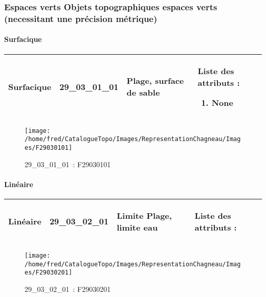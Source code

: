 \documentclass[12pt,titlepage,oneside]{book}
\begin{document}
\subsubsection{\large Espaces verts Objets topographiques espaces verts (necessitant une précision métrique)}
\paragraph{Surfacique}
\noindent
\vspace{\baselineskip}

\renewcommand{\arraystretch}{1.2}
\begin{supertabular}{|p{10cm}|c|p{13cm}|p{12cm}|}
 Surfacique & 29\_03\_01\_01 & Plage, surface de sable & Liste des attributs :
\begin{enumerate}
  \item None\end{enumerate}
\\
\hline
\end{supertabular}
\begin{figure}[h!]
  \hfill         %
  \begin{minipage}[t]{3cm}
    \begin{center}
      \texttt{[image: /home/fred/CatalogueTopo/Images/RepresentationChagneau/Images/F29030101]}
      \caption[~29\_03\_01\_01]{\small{29\_03\_01\_01~:} \tiny{F29030101}}\label{F29030101}
    \end{center}
  \end{minipage}
\end{figure}


\paragraph{Linéaire}
\noindent
\vspace{\baselineskip}

\renewcommand{\arraystretch}{1.2}
\begin{supertabular}{|p{10cm}|c|p{13cm}|p{12cm}|}
 Linéaire & 29\_03\_02\_01 & Limite Plage, limite eau & Liste des attributs :
\begin{enumerate}
\end{enumerate}
\\
\hline
\end{supertabular}
\begin{figure}[h!]
  \hfill         %
  \begin{minipage}[t]{3cm}
    \begin{center}
      \texttt{[image: /home/fred/CatalogueTopo/Images/RepresentationChagneau/Images/F29030201]}
      \caption[~29\_03\_02\_01]{\small{29\_03\_02\_01~:} \tiny{F29030201}}\label{F29030201}
    \end{center}
  \end{minipage}
\end{figure}
\end{document}
